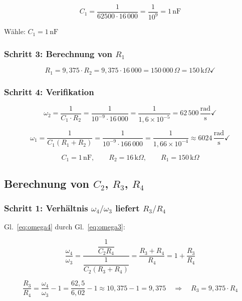 \documentclass[12pt,a4paper]{article}
\begin{document}
\[
  C_1 = \frac{1}{62500 \cdot 16\,000}
      = \frac{1}{10^{9}}
      = 1\,\text{nF}
\]

Wähle: $\boxed{C_1 = 1\,\text{nF}}$

\subsubsection*{Schritt 3: Berechnung von $R_1$}

\[
  R_1 = 9{,}375 \cdot R_2 = 9{,}375 \cdot 16\,000 = 150\,000\,\Omega
  = 150\,\text{k}\Omega \checkmark
\]

\subsubsection*{Schritt 4: Verifikation}

\[
  \omega_2 = \frac{1}{C_1 \cdot R_2}
           = \frac{1}{10^{-9} \cdot 16\,000}
           = \frac{1}{1{,}6 \times 10^{-5}}
           = 62\,500\,\frac{\text{rad}}{\text{s}} \checkmark
\]

\[
  \omega_1 = \frac{1}{C_1(R_1+R_2)}
           = \frac{1}{10^{-9} \cdot 166\,000}
           = \frac{1}{1{,}66 \times 10^{-4}}
           \approx 6024\,\frac{\text{rad}}{\text{s}} \checkmark
\]

\begin{tcolorbox}[ergebnis, title={Ergebnis f\"{u}r $C_1$, $R_1$, $R_2$}]
\[
  C_1 = 1\,\text{nF}, \qquad R_2 = 16\,\text{k}\Omega, \qquad R_1 = 150\,\text{k}\Omega
\]
\end{tcolorbox}

\subsection{Berechnung von $C_2$, $R_3$, $R_4$}

\subsubsection*{Schritt 1: Verhältnis $\omega_4 / \omega_3$ liefert $R_3/R_4$}

Gl.~\eqref{eq:omega4} durch Gl.~\eqref{eq:omega3}:

\[
  \frac{\omega_4}{\omega_3}
  = \frac{\dfrac{1}{C_2 R_4}}{\dfrac{1}{C_2(R_3+R_4)}}
  = \frac{R_3 + R_4}{R_4}
  = 1 + \frac{R_3}{R_4}
\]

\[
  \frac{R_3}{R_4}
  = \frac{\omega_4}{\omega_3} - 1
  = \frac{62{,}5}{6{,}02} - 1
  \approx 10{,}375 - 1
  = 9{,}375
  \quad \Longrightarrow \quad
  \boxed{R_3 = 9{,}375 \cdot R_4}
\]
\end{document}
